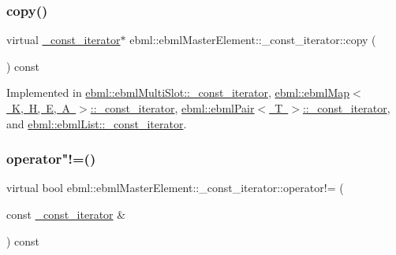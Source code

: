 \subsubsection{\texorpdfstring{copy()}{copy()}}
{\footnotesize\ttfamily virtual \mbox{\hyperlink{classebml_1_1ebmlMasterElement_1_1__const__iterator}{\+\_\+const\+\_\+iterator}}$\ast$ ebml\+::ebml\+Master\+Element\+::\+\_\+const\+\_\+iterator\+::copy (\begin{DoxyParamCaption}{ }\end{DoxyParamCaption}) const\hspace{0.3cm}{\ttfamily [pure virtual]}}



Implemented in \mbox{\hyperlink{classebml_1_1ebmlMultiSlot_1_1__const__iterator_a412c3cc02df5d62c4a05be31aca752e5}{ebml\+::ebml\+Multi\+Slot\+::\+\_\+const\+\_\+iterator}}, \mbox{\hyperlink{classebml_1_1ebmlMap_1_1__const__iterator_af2bd75417ff0115d8bb53670ff8deaf2}{ebml\+::ebml\+Map$<$ K, H, E, A $>$\+::\+\_\+const\+\_\+iterator}}, \mbox{\hyperlink{classebml_1_1ebmlPair_1_1__const__iterator_a585b8bfa69c6746da17393207e599bca}{ebml\+::ebml\+Pair$<$ T $>$\+::\+\_\+const\+\_\+iterator}}, and \mbox{\hyperlink{classebml_1_1ebmlList_1_1__const__iterator_aae11488b46714c745cdd81d3fb75f57a}{ebml\+::ebml\+List\+::\+\_\+const\+\_\+iterator}}.

\mbox{\label{classebml_1_1ebmlMasterElement_1_1__const__iterator_ac62d190e9da49236835f8219ec307d22}} 
\subsubsection{\texorpdfstring{operator"!=()}{operator!=()}}
{\footnotesize\ttfamily virtual bool ebml\+::ebml\+Master\+Element\+::\+\_\+const\+\_\+iterator\+::operator!= (\begin{DoxyParamCaption}\item[{const \mbox{\hyperlink{classebml_1_1ebmlMasterElement_1_1__const__iterator}{\+\_\+const\+\_\+iterator}} \&}]{ }\end{DoxyParamCaption}) const\hspace{0.3cm}{\ttfamily [pure virtual]}}



